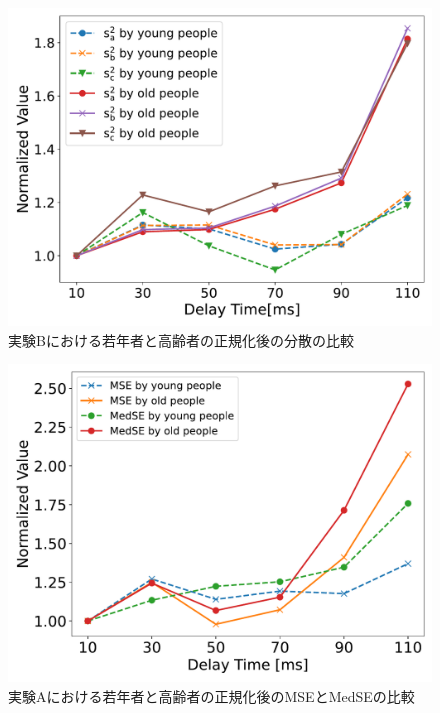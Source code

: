 \begin{figure}[tbp]
  \centering
  \includegraphics[scale=0.3]{figures/Honbann/Comparison_young_old/40_var_normalized.pdf}
  \caption{実験Bにおける若年者と高齢者の正規化後の分散の比較}
  \label{fig:Normalized-Var_40ms_SaSbSc}
\end{figure}
\begin{figure}[tbp]
  \centering
  \includegraphics[scale=0.3]{figures/Honbann/Comparison_young_old/110_MSE-MedSE_normalized.pdf}
  \caption{実験Aにおける若年者と高齢者の正規化後のMSEとMedSEの比較}
  \label{fig:Normalized_110ms_MSE_MedSE}
\end{figure}
